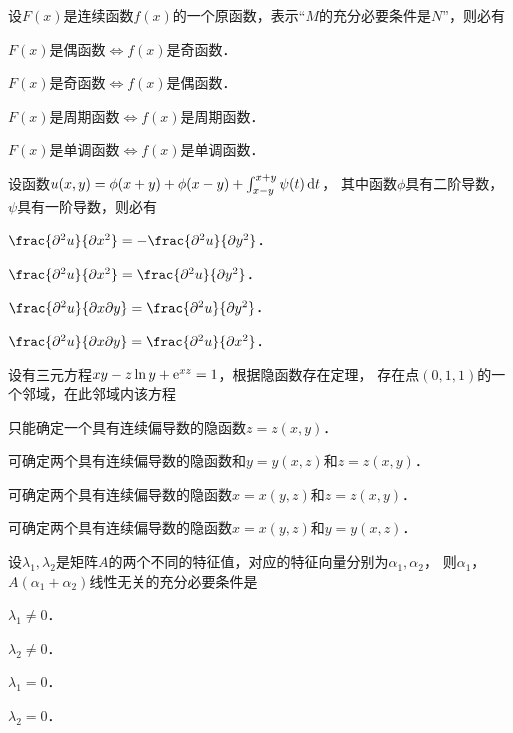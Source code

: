 \documentclass[plain,noanswer,medmath]{../../template/jnuexam}
\begin{document}
\begin{problem}
设$F(x)$是连续函数$f(x)$的一个原函数，表示“$M$的充分必要条件是$N$”，则必有\pickout{}
\begin{abcd}
\item $F(x)$是偶函数$\Leftrightarrow$$f(x)$是奇函数．
\item $F(x)$是奇函数$\Leftrightarrow$$f(x)$是偶函数．
\item $F(x)$是周期函数$\Leftrightarrow$$f(x)$是周期函数．
\item $F(x)$是单调函数$\Leftrightarrow$$f(x)$是单调函数．
\end{abcd}
\end{problem}


\begin{problem}
设函数$u(x,y) = \phi(x + y) + \phi(x - y) + \int_{x - y}^{x + y} \psi(t)\mathop{}\!\mathrm{d} t$，
其中函数$\phi$具有二阶导数，$\psi$具有一阶导数，则必有\pickout{}
\begin{abcd}
\item $\frac{\pd^2 u}{\pd x^2} = - \frac{\pd^2 u}{\pd y^2}$．
\item $\frac{\pd^2 u}{\pd x^2} = \frac{\pd^2 u}{\pd y^2}$．
\item $\frac{\pd^2 u}{\pdx\pd y} = \frac{\pd^2 u}{\pd y^2}$．
\item $\frac{\pd^2 u}{\pdx\pd y} = \frac{\pd^2 u}{\pd x^2}$．
\end{abcd}
\end{problem}


\begin{problem}
设有三元方程$xy - z\ln y + \mathrm{e}^{xz} = 1$，根据隐函数存在定理，
存在点$(0,1,1)$的一个邻域，在此邻域内该方程\pickout{}
\begin{abcd}
\item 只能确定一个具有连续偏导数的隐函数$z = z(x,y)$．
\item 可确定两个具有连续偏导数的隐函数和$y = y(x,z)$和$z = z(x,y)$．
\item 可确定两个具有连续偏导数的隐函数$x = x(y,z)$和$z = z(x,y)$．
\item 可确定两个具有连续偏导数的隐函数$x = x(y,z)$和$y = y(x,z)$．
\end{abcd}
\end{problem}


\begin{problem}
设$\lambda_1,\lambda_2$是矩阵$A$的两个不同的特征值，对应的特征向量分别为$\alpha_1,\alpha_2$，
则$\alpha_1$，$A(\alpha_1 + \alpha_2)$线性无关的充分必要条件是\pickout{}
\begin{abcd}
\item $\lambda_1 \ne 0$．
\item $\lambda_2 \ne 0$．
\item $\lambda_1 = 0$．
\item $\lambda_2 = 0$．
\end{abcd}
\end{problem}
\end{document}
